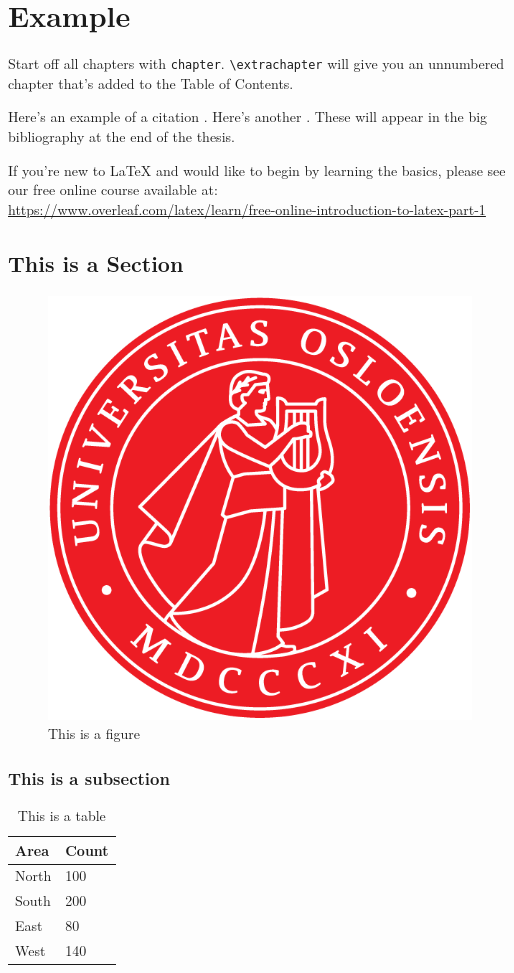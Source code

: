 \chapter{Example}


Start off all chapters with \verb|chapter|.  \verb|\extrachapter| will give you an unnumbered chapter that's added to the Table of Contents. 

Here's an example of a citation \citep{GMP81}. Here's another \citep{PP98}. These will appear in the big bibliography at the end of the thesis.

If you're new to \LaTeX{} and would like to begin by learning the basics, please see our free online course available at:\\ \url{https://www.overleaf.com/latex/learn/free-online-introduction-to-latex-part-1} 


\section{This is a Section}
\lipsum[1-2] \citep{Lin2016a,Berg2006}

\begin{figure}[hbt!]
\centering
\includegraphics[width=.3\textwidth]{uio.png}
\caption{This is a figure}\label{fig:logo}
\end{figure}

\subsection{This is a subsection}

\begin{table}[hbt!]
\centering
\begin{tabular}{ll}
\hline
Area & Count\\
\hline
North & 100\\
South & 200\\
East & 80\\
West & 140\\
\hline
\end{tabular}
\caption{This is a table}\label{tab:sample}
\end{table}

